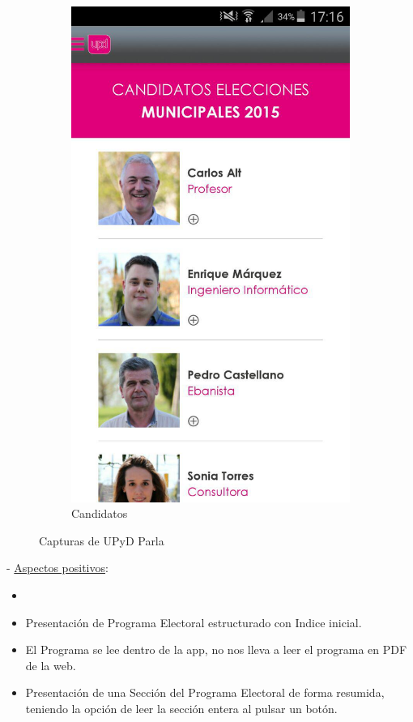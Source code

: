\begin{figure}[H]
\begin{subfigure}[b]{0.3\textwidth}
                \includegraphics[width=\textwidth]{Media/Captures/UPyDParlaCandidates.jpg}
                \caption{Candidatos}
                \label{fig:upydCandidates}
        \end{subfigure}
        \caption{Capturas de UPyD Parla}\label{fig:upydCaptures}
\end{figure}

 - \underline{Aspectos positivos}:

\begin{itemize}
	\item 
	\item Presentación de Programa Electoral estructurado con Indice inicial.
	\item El Programa se lee dentro de la app, no nos lleva a leer el programa en PDF de la web. 
	\item Presentación de una Sección del Programa Electoral de forma resumida, teniendo la opción de leer la sección entera al pulsar un botón.
\end{itemize}

